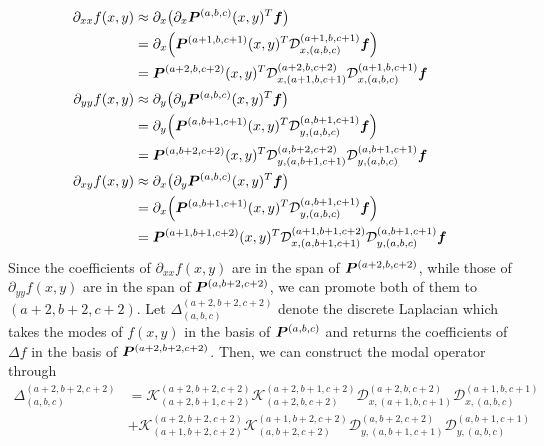 \begin{align*}
	\partial_{xx}f(x,y) &\approx \partial_x\big(\partial_x \boldsymbol{P}^{(a,b,c)}(x,y)^T\boldsymbol{f}\big) \\
	&= \partial_x\Big(\boldsymbol{P}^{(a+1,b,c+1)}(x,y)^T \mathcal{D}_{x,(a,b,c)}^{(a+1,b,c+1)}\boldsymbol{f}\Big) \\
	&= \boldsymbol{P}^{(a+2,b,c+2)}(x,y)^T\mathcal{D}_{x,(a+1,b,c+1)}^{(a+2,b,c+2)}\mathcal{D}_{x,(a,b,c)}^{(a+1,b,c+1)}\boldsymbol{f}\\
	\partial_{yy}f(x,y) &\approx \partial_y\big(\partial_y \boldsymbol{P}^{(a,b,c)}(x,y)^T\boldsymbol{f}\big) \\
	&= \partial_y\Big(\boldsymbol{P}^{(a,b+1,c+1)}(x,y)^T \mathcal{D}_{y,(a,b,c)}^{(a,b+1,c+1)}\boldsymbol{f}\Big) \\
	&= \boldsymbol{P}^{(a,b+2,c+2)}(x,y)^T\mathcal{D}_{y,(a,b+1,c+1)}^{(a,b+2,c+2)}\mathcal{D}_{y,(a,b,c)}^{(a,b+1,c+1)}\boldsymbol{f}\\
	\partial_{xy}f(x,y) &\approx \partial_x\big(\partial_y \boldsymbol{P}^{(a,b,c)}(x,y)^T\boldsymbol{f}\big) \\
&= \partial_x\Big(\boldsymbol{P}^{(a,b+1,c+1)}(x,y)^T \mathcal{D}_{y,(a,b,c)}^{(a,b+1,c+1)}\boldsymbol{f}\Big) \\
&= \boldsymbol{P}^{(a+1,b+1,c+2)}(x,y)^T\mathcal{D}_{x,(a,b+1,c+1)}^{(a+1,b+1,c+2)}\mathcal{D}_{y,(a,b,c)}^{(a,b+1,c+1)}\boldsymbol{f}
\end{align*}  
Since the coefficients of $\partial_{xx}f(x,y)$ are in the span of $\boldsymbol{P}^{(a+2,b,c+2)}$, while those of $\partial_{yy}f(x,y)$ are in the span of $\boldsymbol{P}^{(a,b+2,c+2)}$, we can promote both of them to $(a+2,b+2,c+2)$. Let $\Delta_{(a,b,c)}^{(a+2,b+2,c+2)}$ denote the discrete Laplacian which takes the modes of $f(x,y)$ in the basis of $\boldsymbol{P}^{(a,b,c)}$ and returns the coefficients of $\Delta f$ in the basis of $\boldsymbol{P}^{(a+2,b+2,c+2)}$. Then, we can construct the modal operator through
\begin{equation}\label{eq:laptrimat}
	\begin{split}
	\Delta_{(a,b,c)}^{(a+2,b+2,c+2)} &= \mathcal{K}_{(a+2,b+1,c+2)}^{(a+2,b+2,c+2)}\mathcal{K}_{(a+2,b,c+2)}^{(a+2,b+1,c+2)}\mathcal{D}_{x,(a+1,b,c+1)}^{(a+2,b,c+2)}\mathcal{D}_{x,(a,b,c)}^{(a+1,b,c+1)}\\
	&+\mathcal{K}_{(a+1,b+2,c+2)}^{(a+2,b+2,c+2)}\mathcal{K}_{(a,b+2,c+2)}^{(a+1,b+2,c+2)}\mathcal{D}_{y,(a,b+1,c+1)}^{(a,b+2,c+2)}\mathcal{D}_{y,(a,b,c)}^{(a,b+1,c+1)}
	\end{split}
\end{equation}

